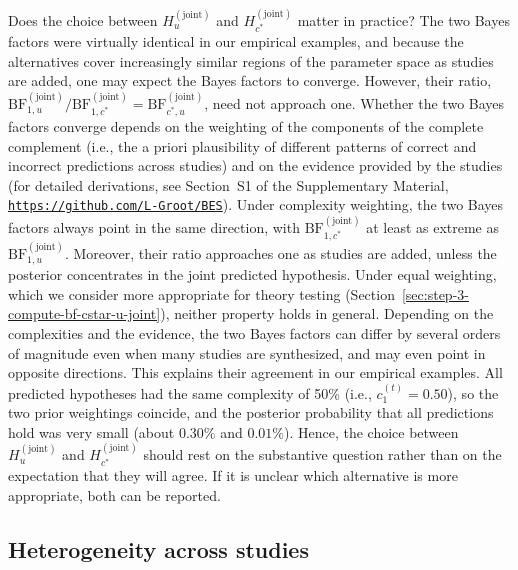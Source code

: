 \documentclass[letterpaper,11pt,oneside]{article}
\newcommand{\suppurl}{\href{https://github.com/L-Groot/BES}{\nolinkurl{https://github.com/L-Groot/BES}}}
\begin{document}
Does the choice between $H_u^{(\text{joint})}$ and $H_{c^*}^{(\text{joint})}$ matter in practice? The two Bayes factors were virtually identical in our empirical examples, and because the alternatives cover increasingly similar regions of the parameter space as studies are added, one may expect the Bayes factors to converge. However, their ratio, $\mathrm{BF}_{1,u}^{(\text{joint})}/\mathrm{BF}_{1,c^*}^{(\text{joint})} = \mathrm{BF}_{c^*,u}^{(\text{joint})}$, need not approach one. Whether the two Bayes factors converge depends on the weighting of the components of the complete complement (i.e., the a priori plausibility of different patterns of correct and incorrect predictions across studies) and on the evidence provided by the studies (for detailed derivations, see Section~S1 of the Supplementary Material, \suppurl). Under complexity weighting, the two Bayes factors always point in the same direction, with $\mathrm{BF}_{1,c^*}^{(\text{joint})}$ at least as extreme as $\mathrm{BF}_{1,u}^{(\text{joint})}$. Moreover, their ratio approaches one as studies are added, unless the posterior concentrates in the joint predicted hypothesis. Under equal weighting, which we consider more appropriate for theory testing (Section~\ref{sec:step-3-compute-bf-cstar-u-joint}), neither property holds in general. Depending on the complexities and the evidence, the two Bayes factors can differ by several orders of magnitude even when many studies are synthesized, and may even point in opposite directions. This explains their agreement in our empirical examples. All predicted hypotheses had the same complexity of 50\% (i.e., $c_1^{(t)} = 0.50$), so the two prior weightings coincide, and the posterior probability that all predictions hold was very small (about $0.30\%$ and $0.01\%$). Hence, the choice between $H_u^{(\text{joint})}$ and $H_{c^*}^{(\text{joint})}$ should rest on the substantive question rather than on the expectation that they will agree. If it is unclear which alternative is more appropriate, both can be reported.

\subsection{Heterogeneity across studies}
\end{document}
